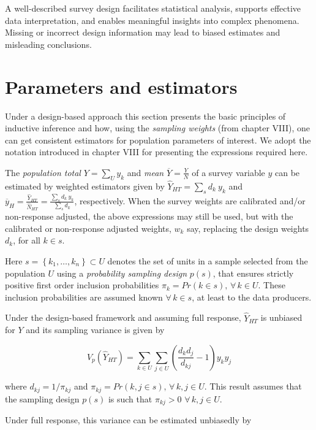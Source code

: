 \documentclass[
  12pt,
]{book}
\begin{document}
A well-described survey design facilitates statistical analysis, supports effective data interpretation, and enables meaningful insights into complex phenomena. Missing or incorrect design information may lead to biased estimates and misleading conclusions.

\section{Parameters and estimators}\label{parameters-and-estimators}

Under a design-based approach this section presents the basic principles of inductive inference and how, using the \emph{sampling weights} (from chapter VIII), one can get consistent estimators for population parameters of interest. We adopt the notation introduced in chapter VIII for presenting the expressions required here.

The \emph{population total} \(Y = \sum _{U} y_k\) and \emph{mean} \(\overline Y = \frac Y N\) of a survey variable \(y\) can be estimated by weighted estimators given by \(\widehat Y _{HT} = \sum _{s} d_k \ y_k\) and \(\overline y_{H} = \frac {\widehat Y_{HT}} {\widehat N_{HT}} = \frac {\sum_{s} d_k \ y_k} {\sum_{s} d_k}\), respectively. When the survey weights are calibrated and/or non-response adjusted, the above expressions may still be used, but with the calibrated or non-response adjusted weights, \(w_k\) say, replacing the design weights \(d_k\), for all \(k \in s\).

Here \(s = \left\{ k_1, \ldots, k_n \right\} \subset U\) denotes the set of units in a sample selected from the population \(U\) using a \emph{probability sampling design} \(p(s)\), that ensures strictly positive first order inclusion probabilities \(\pi_k = Pr(k \in s), \, \forall \, k \in U\). These inclusion probabilities are assumed known \(\forall \, k \in s\), at least to the data producers.

Under the design-based framework and assuming full response, \(\widehat Y _{HT}\) is unbiased for \(Y\) and its sampling variance is given by

\[
V_p \left( \widehat{Y}_{HT} \right) = \sum_{k \in U} \sum_{j \in U} \left( \frac {d_k d_j} {d_{kj}} - 1 \right) y_k y_j
\]

where \(d_{kj} = 1 / \pi_{kj}\) and \(\pi_{kj} = Pr(k,j \in s), \, \forall \, k,j \in U\). This result assumes that the sampling design \(p(s)\) is such that \(\pi_{kj} > 0 \,\, \forall \, k,j \in U\).

Under full response, this variance can be estimated unbiasedly by
\end{document}
